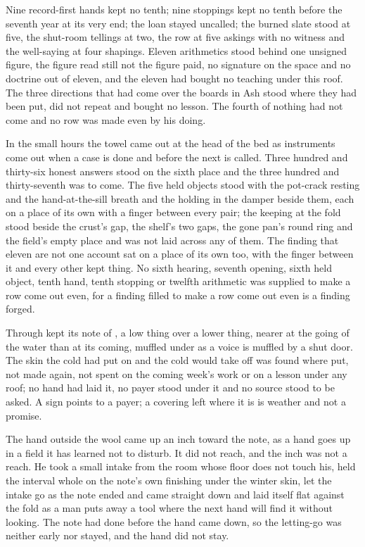 Nine record-first hands kept no tenth; nine stoppings kept no tenth before the seventh year at its very end; the loan stayed uncalled; the burned slate stood at five, the shut-room tellings at two, the row at five askings with no witness and the well-saying at four shapings. Eleven arithmetics stood behind one unsigned figure, the figure read still not the figure paid, no signature on the space and no doctrine out of eleven, and the eleven had bought no teaching under this roof. The three directions that had come over the boards in Ash stood where they had been put, did not repeat and bought no lesson. The fourth of nothing had not come and no row was made even by his doing.

\scenebreak

In the small hours the towel came out at the head of the bed as instruments come out when a case is done and before the next is called. Three hundred and thirty-six honest answers stood on the sixth place and the three hundred and thirty-seventh was to come. The five held objects stood with the pot-crack resting and the hand-at-the-sill breath and the holding in the damper beside them, each on a place of its own with a finger between every pair; the keeping at the fold stood beside the crust's gap, the shelf's two gaps, the gone pan's round ring and the field's empty place and was not laid across any of them. The finding that eleven are not one account sat on a place of its own too, with the finger between it and every other kept thing. No sixth hearing, seventh opening, sixth held object, tenth hand, tenth stopping or twelfth arithmetic was supplied to make a row come out even, for a finding filled to make a row come out even is a finding forged.

Through   kept its note of , a low thing over a lower thing, nearer at the going of the water than at its coming, muffled under  as a voice is muffled by a shut door. The skin the cold had put on and the cold would take off was found where put, not made again, not spent on the coming week's work or on a lesson under any roof; no hand had laid it, no payer stood under it and no source stood to be asked. A sign points to a payer; a covering left where it is is weather and not a promise.

The hand outside the wool came up an inch toward the note, as a hand goes up in a field it has learned not to disturb. It did not reach, and the inch was not a reach. He took a small intake from the room whose floor does not touch his, held the interval whole on the note's own finishing under the winter skin, let the intake go as the note ended and came straight down and laid itself flat against the fold as a man puts away a tool where the next hand will find it without looking. The note had done before the hand came down, so the letting-go was neither early nor stayed, and the hand did not stay.

